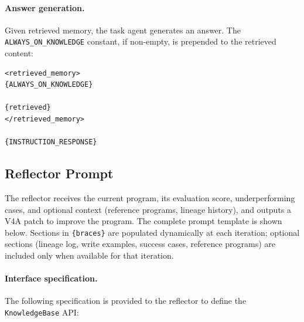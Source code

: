 \paragraph{Answer generation.}
Given retrieved memory, the task agent generates an answer.
The \texttt{ALWAYS\_ON\_KNOWLEDGE} constant, if non-empty, is prepended to the retrieved content:
\begin{lstlisting}[style=evolvedcode, basicstyle=\ttfamily\scriptsize]
<retrieved_memory>
{ALWAYS_ON_KNOWLEDGE}

{retrieved}
</retrieved_memory>

{INSTRUCTION_RESPONSE}
\end{lstlisting}

\subsection{Reflector Prompt}
\label{app:reflector-prompt}

The reflector receives the current program, its evaluation score, underperforming cases, and optional context (reference programs, lineage history), and outputs a V4A patch to improve the program.
The complete prompt template is shown below.
Sections in \texttt{\{braces\}} are populated dynamically at each iteration; optional sections (lineage log, write examples, success cases, reference programs) are included only when available for that iteration.

\paragraph{Interface specification.}
The following specification is provided to the reflector to define the \texttt{KnowledgeBase} API:

